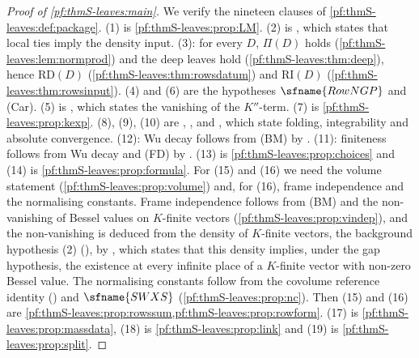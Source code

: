 \begin{proof}[Proof of \cref{pf:thmS-leaves:main}]
We verify the nineteen clauses of \cref{pf:thmS-leaves:def:package}.
(1) is \cref{pf:thmS-leaves:prop:LM}. (2) is , which states that local ties imply
the density input. (3): for every $D$, $\Pi(D)$ holds (\cref{pf:thmS-leaves:lem:normprod}) and the deep leaves hold
(\cref{pf:thmS-leaves:thm:deep}), hence $\mathrm{RD}(D)$ (\cref{pf:thmS-leaves:thm:rowsdatum}) and $\mathrm{RI}(D)$
(\cref{pf:thmS-leaves:thm:rowsinput}).
(4) and (6) are the hypotheses $\sfname{RowNGP}$ and (Car). (5) is , which states
the vanishing of the $K''$-term. (7) is \cref{pf:thmS-leaves:prop:kexp}. (8), (9), (10) are
, , and ,
which state folding, integrability and absolute convergence. (12): Wu decay follows from (BM) by
. (11): finiteness follows from Wu decay and (FD) by
. (13) is \cref{pf:thmS-leaves:prop:choices} and (14) is \cref{pf:thmS-leaves:prop:formula}.
For (15) and (16) we need the volume statement (\cref{pf:thmS-leaves:prop:volume}) and, for (16), frame independence and the
normalising constants. Frame independence follows from (BM) and the non-vanishing of Bessel values on $K$-finite vectors
(\cref{pf:thmS-leaves:prop:vindep}), and the non-vanishing is deduced from the density of $K$-finite vectors, the background
hypothesis (2) (), by
, which states that this density implies, under the gap hypothesis, the
existence at every infinite place of a $K$-finite vector with non-zero Bessel value. The
normalising constants follow from the covolume reference identity () and
$\sfname{SWXS}$ (\cref{pf:thmS-leaves:prop:nc}). Then (15) and (16) are \cref{pf:thmS-leaves:prop:rowssum,pf:thmS-leaves:prop:rowform}. (17)
is \cref{pf:thmS-leaves:prop:massdata}, (18) is \cref{pf:thmS-leaves:prop:link} and (19) is \cref{pf:thmS-leaves:prop:split}.
\end{proof}

